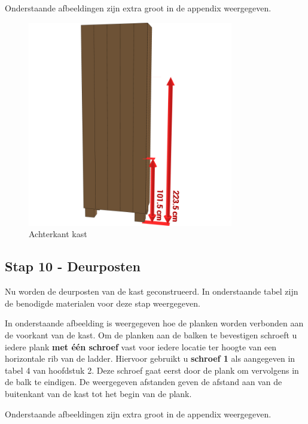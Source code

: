 \documentclass{article}
\begin{document}
Onderstaande afbeeldingen zijn extra groot in de appendix weergegeven.

\begin{figure}[h!]
    \centering
    \includegraphics[width=0.8\textwidth]{scene 9 - achterkant.png}
    \caption{Achterkant kast}
    \label{fig:stap 9}
\end{figure}

\clearpage
\newpage

\subsection{Stap 10 - Deurposten}

Nu worden de deurposten van de kast geconstrueerd. In onderstaande tabel zijn de benodigde materialen voor deze stap weergegeven.



In onderstaande afbeelding is weergegeven hoe de planken worden verbonden aan de voorkant van de kast. Om de planken aan de balken te bevestigen schroeft u iedere plank \textbf{met \'{e}\'{e}n schroef} vast voor iedere locatie ter hoogte van een horizontale rib van de ladder. Hiervoor gebruikt u \textbf{schroef 1} als aangegeven in tabel 4 van hoofdstuk 2. Deze schroef gaat eerst door de plank om vervolgens in de balk te eindigen. De weergegeven afstanden geven de afstand aan van de buitenkant van de kast tot het begin van de plank.

Onderstaande afbeeldingen zijn extra groot in de appendix weergegeven.
\end{document}
